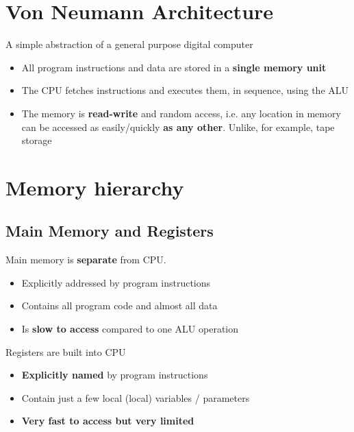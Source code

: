 \documentclass{article}
\begin{document}
\tableofcontents

\newpage

\section{Von Neumann Architecture}
\begin{flushleft}
A simple abstraction of a general purpose digital computer
\begin{itemize}
  \item All program instructions and data are stored in a \textbf{single memory unit}
  \item The CPU fetches instructions and executes them, in sequence, using the ALU
  \item The memory is \textbf{read-write} and random access, i.e. any location in memory can be accessed as easily/quickly \textbf{as any other}. Unlike, for example, tape storage
\end{itemize}
\end{flushleft}

\section{Memory hierarchy}

\subsection{Main Memory and Registers}
\begin{flushleft}
Main memory is \textbf{separate} from CPU.
\begin{itemize}
  \item Explicitly addressed by program instructions
  \item Contains all program code and almost all data
  \item Is \textbf{slow to access} compared to one ALU operation
\end{itemize}
Registers are built into CPU
\begin{itemize}
  \item \textbf{Explicitly named} by program instructions
  \item Contain just a few local (local) variables / parameters
  \item \textbf{Very fast to access but very limited}
\end{itemize}
\end{flushleft}
\end{document}
